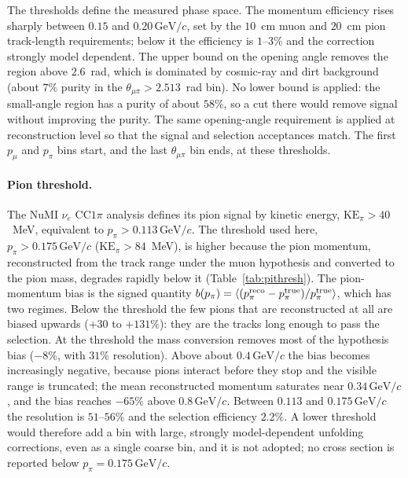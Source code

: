 \documentclass[11pt,a4paper]{article}
\newcommand{\GeVc}{\,\text{GeV}\!/c}
\begin{document}
The thresholds define the measured phase space. The momentum efficiency rises sharply between
$0.15$ and $0.20\GeVc$, set by the $10$~cm muon and $20$~cm pion track-length requirements; below
it the efficiency is $1$--$3\%$ and the correction strongly model dependent. The upper bound on
the opening angle removes the region above $2.6$~rad, which is dominated by cosmic-ray and dirt
background (about $7\%$ purity in the $\theta_{\mu\pi}>2.513$~rad bin). No lower bound is applied:
the small-angle region has a purity of about $58\%$, so a cut there would remove signal without
improving the purity. The same opening-angle requirement is applied at reconstruction level so that
the signal and selection acceptances match. The first $p_\mu$ and $p_\pi$ bins start, and the last
$\theta_{\mu\pi}$ bin ends, at these thresholds.

\paragraph{Pion threshold.}
\label{sec:ppi_regimes}
The NuMI $\nu_e$ CC$1\pi$ analysis defines its pion signal by kinetic energy,
$\mathrm{KE}_\pi>40$~MeV, equivalent to $p_\pi>0.113\GeVc$. The threshold used here,
$p_\pi>0.175\GeVc$ ($\mathrm{KE}_\pi>84$~MeV), is higher because the pion momentum, reconstructed
from the track range under the muon hypothesis and converted to the pion mass, degrades rapidly
below it (Table~\ref{tab:pithresh}). The pion-momentum bias is the signed
quantity $b(p_\pi)=\langle(p_\pi^{\rm reco}-p_\pi^{\rm true})/p_\pi^{\rm true}\rangle$, which has
two regimes. Below the threshold the few pions that are reconstructed at all are biased upwards
($+30$ to $+131\%$): they are the tracks long enough to pass the selection. At the threshold the
mass conversion removes most of the hypothesis bias ($-8\%$, with $31\%$ resolution). Above about
$0.4\GeVc$ the bias becomes increasingly negative, because pions interact before they stop and the
visible range is truncated; the mean reconstructed momentum saturates near $0.34\GeVc$, and the
bias reaches $-65\%$ above $0.8\GeVc$. Between $0.113$ and $0.175\GeVc$ the resolution is
$51$--$56\%$ and the selection efficiency $2.2\%$. A lower threshold would therefore add a bin with
large, strongly model-dependent unfolding corrections, even as a single coarse bin, and it is not
adopted; no cross section is reported below $p_\pi=0.175\GeVc$.
\end{document}
